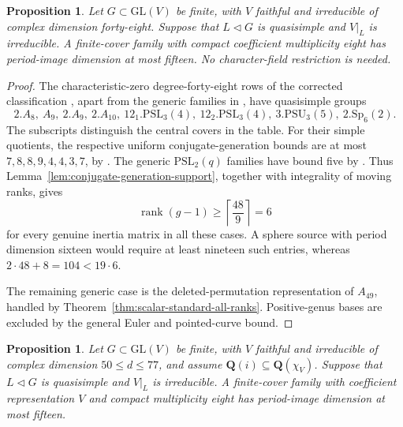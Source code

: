 \documentclass[11pt]{article}
\newtheorem{proposition}[theorem]{Proposition}
\theoremstyle{definition}
\theoremstyle{remark}
\newcommand{\Q}{\mathbf Q}
\begin{document}
\begin{proposition}\label{prop:quasisimple-degree48}
Let $G\subset\mathrm{GL}(V)$ be finite, with $V$ faithful and
irreducible of complex dimension forty-eight.  Suppose that
$L\triangleleft G$ is quasisimple and $V|_L$ is irreducible.
A finite-cover family with compact coefficient multiplicity eight
has period-image dimension at most fifteen.
No character-field restriction is needed.
\end{proposition}

\begin{proof}
The characteristic-zero degree-forty-eight rows of the corrected
classification \cite[Table~2, p.~106]{HissMalleCorrection},
apart from the generic families in
\cite[Table~2, p.~31]{HissMalle}, have quasisimple groups
\[
 2.A_8,\ A_9,\ 2.A_9,\ 2.A_{10},\
 12_1.\mathrm{PSL}_3(4),\
 12_2.\mathrm{PSL}_3(4),\
 3.\mathrm{PSU}_3(5),\
 2.\mathrm{Sp}_6(2).
\]
The subscripts distinguish the central covers in the table.
For their simple quotients, the respective uniform
conjugate-generation bounds are at most
$7,8,8,9,4,4,3,7$, by
\cite[Lemmas~3.2--3.3 and 6.1; Theorem~4.2]{GS}.
The generic $\mathrm{PSL}_2(q)$ families have bound five by
\cite[Lemma~3.1]{GS}.  Thus
Lemma~\ref{lem:conjugate-generation-support}, together with
integrality of moving ranks, gives
\[
 \operatorname{rank}(g-1)\geq\left\lceil\frac{48}{9}\right\rceil=6
\]
for every genuine inertia matrix in all these cases.
A sphere source with period dimension sixteen would require
at least nineteen such entries, whereas
$2\cdot48+8=104<19\cdot6$.

The remaining generic case is the deleted-permutation
representation of $A_{49}$, handled by
Theorem~\ref{thm:scalar-standard-all-ranks}.
Positive-genus bases are excluded by the general Euler and
pointed-curve bound.
\end{proof}


\begin{proposition}\label{prop:quasisimple-degrees50-77}
Let $G\subset\mathrm{GL}(V)$ be finite, with $V$ faithful and
irreducible of complex dimension $50\leq d\leq77$, and assume
$\Q(i)\subseteq\Q(\chi_V)$. Suppose that $L\triangleleft G$
is quasisimple and $V|_L$ is irreducible. A finite-cover family
with coefficient representation $V$ and compact multiplicity
eight has period-image dimension at most fifteen.
\end{proposition}
\end{document}
